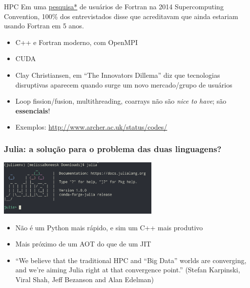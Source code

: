 \documentclass{beamer}
\begin{document}
\begin{darkframes}
  \begin{frame}{HPC}
    Em uma \href{https://software.intel.com/en-us/blogs/2015/03/27/doctor-fortran-in-the-future-of-fortran}{pesquisa*} de usuários de Fortran na 2014 Supercomputing Convention, 100\% dos entrevistados disse que acreditavam que ainda estariam usando Fortran em 5 anos.
    \begin{itemize}
    \item C++ e Fortran moderno, com OpenMPI
    \item CUDA
    \item Clay Christiansen, em ``The Innovators Dillema'' diz que tecnologias disruptivas aparecem quando surge um novo mercado/grupo de usuários
    \item Loop fission/fusion, multithreading, coarrays não são \emph{nice to have}; são \textbf{essenciais}!
    \item Exemplos: \url{http://www.archer.ac.uk/status/codes/}
    \end{itemize}
  \end{frame}
  
  \begin{frame}
    \frametitle{Julia: a solução para o problema das duas linguagens?}
    \centering
    \includegraphics[width=8cm]{figures/juliaconsole.png}
    \begin{itemize}
    \item<2-> Não é um Python mais rápido, e sim um C++ mais produtivo
    \item<3-> Mais próximo de um AOT do que de um JIT
    \item<4-> ``We believe that the traditional HPC and “Big Data” worlds are converging, and we’re aiming Julia right at that convergence point.'' (Stefan Karpinski, Viral Shah, Jeff Bezanson and Alan Edelman)
    \end{itemize}
  \end{frame}
  

\end{darkframes}
\end{document}
